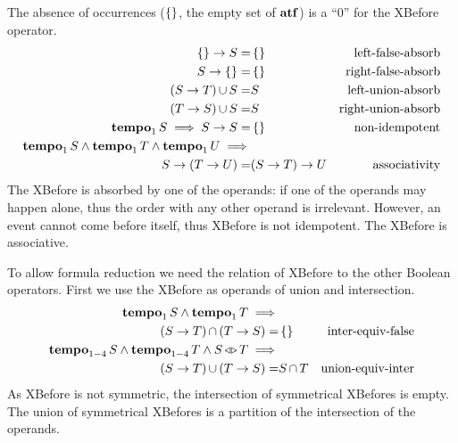 \documentclass[12pt,openright,twoside,a4paper,oldfontcommands,english,brazil,final]{abntex2}
\theoremstyle{theo}
\def\xbeforeop{\ensuremath\rightarrow}
\newcommand{\xbefore}[2]{\ensuremath #1 \xbeforeop #2 }
\def\tempoop{\ensuremath\operatorname{\mathbf{tempo}}}
\newcommand{\tempo}[2][1-4]{\ensuremath\tempoop_{#1} #2}
\def\independenteventsop{\ensuremath\operatorname{\triangleleft\triangleright}}
\newcommand{\independentevents}[2]{\ensuremath #1 \independenteventsop #2}
\def\False{\ensuremath\operatorname{\left\{\right\}}}
\def\algebraset{\ensuremath\mathbf{atf}}
\newcommand{\parsin}[1]{\ensuremath\left( #1 \right)}
\def\union{\ensuremath\operatorname{\cup}}
\def\inter{\ensuremath\operatorname{\cap}}
\begin{document}
The absence of occurrences ($\False$, the empty set of $\algebraset$) is a ``0'' for the \ac{XBefore} operator.
%
\begin{subequations}
\begin{align}
\xbefore{\False}{S} =&
  \False &
  \text{left-false-absorb}
  \label{thm:xbefore-of-false-1}\\
%
\xbefore{S}{\False} =&
  \False &
  \text{right-false-absorb}
  \label{thm:xbefore-of-false-2}\\
%
\left(\xbefore{S}{T}\right) \union S =& S &
  \text{left-union-absorb}
  \label{thm:xbefore-sup-absorb-1}\\
%
\left(\xbefore{T}{S}\right) \union S =& S &
  \text{right-union-absorb}
  \label{thm:xbefore-sup-absorb-2}\\
%
\tempo[1]{S} \implies
  \xbefore{S}{S} =&
  \False &
  \text{non-idempotent}
  \label{thm:xbefore-not-idempotent}\\
%
\tempo[1]{S}\land\tempo[1]{T}\land \tempo[1]{U}\implies&\nonumber\\
  \xbefore{S}{(\xbefore{T}{U})} =&
  \xbefore{(\xbefore{S}{T})}{U} &
  \text{associativity}
  \label{thm:xbefore-associativity}
%
\end{align}
\end{subequations}
%
The \ac{XBefore} is absorbed by one of the operands: if one of the operands may happen alone, thus the order with any other operand is irrelevant.
However, an event cannot come before itself, thus \ac{XBefore} is not idempotent.
The \ac{XBefore} is associative.

To allow formula reduction we need the relation of \ac{XBefore} to the other Boolean operators.
First we use the \ac{XBefore} as operands of union and intersection.
%
\begin{subequations}
\begin{align}
\tempo[1]{S} \land \tempo[1]{T}\implies&\nonumber\\
  \parsin{\xbefore{S}{T}} \inter \parsin{\xbefore{T}{S}} =&
  \False &
  \text{inter-equiv-false}
  \label{thm:xbefore-inf-equiv-bot}\\
%
\tempo{S} \land \tempo{T} \land \independentevents{S}{T}\implies&\nonumber\\
  \parsin{\xbefore{S}{T}} \union \parsin{\xbefore{T}{S}} =&
  S \inter T &
  \text{union-equiv-inter}
  \label{thm:xbefore-sup-equiv-inf}
%
\end{align}
\end{subequations}
%
As \ac{XBefore} is not symmetric, the intersection of symmetrical \acp{XBefore} is empty.
The union of symmetrical \acp{XBefore} is a partition of the intersection of the operands.
\end{document}
